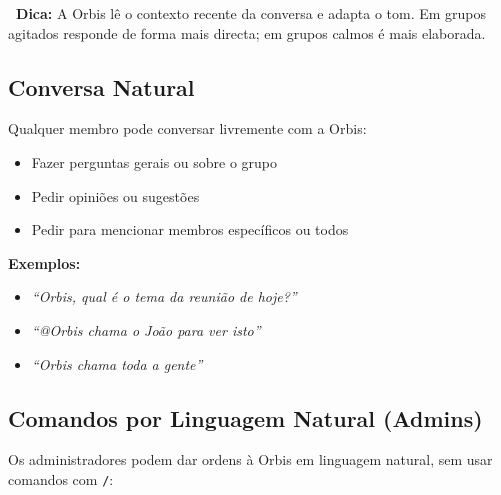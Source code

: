 \documentclass[12pt,a4paper]{article}
\begin{document}
\begin{tcolorbox}[notebox]
\textbf{\textcolor{orbisblue}{\faLightbulb\ Dica:}} A Orbis lê o contexto recente da conversa e adapta o tom. Em grupos agitados responde de forma mais directa; em grupos calmos é mais elaborada.
\end{tcolorbox}

\subsection{Conversa Natural}

Qualquer membro pode conversar livremente com a Orbis:

\begin{itemize}[leftmargin=1.5em, itemsep=2pt]
  \item Fazer perguntas gerais ou sobre o grupo
  \item Pedir opiniões ou sugestões
  \item Pedir para mencionar membros específicos ou todos
\end{itemize}

\textbf{Exemplos:}
\begin{itemize}[leftmargin=1.5em, itemsep=2pt]
  \item \textit{``Orbis, qual é o tema da reunião de hoje?''}
  \item \textit{``@Orbis chama o João para ver isto''}
  \item \textit{``Orbis chama toda a gente''}
\end{itemize}

\subsection{Comandos por Linguagem Natural (Admins)}

Os administradores podem dar ordens à Orbis em linguagem natural, sem usar comandos com \texttt{/}:
\end{document}

